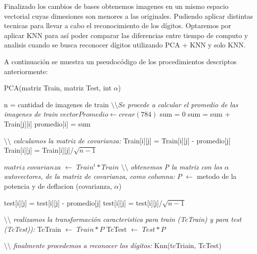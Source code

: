  Finalizado los cambios de bases obtenemos imagenes en un mismo espacio vectorial cuyas dimesiones son menores a las originales. Pudiendo aplicar distintas tecnicas para llevar a cabo el reconocimiento de los dígitos. Optaremos por aplicar KNN para así poder comparar las diferencias entre tiempo de computo y analisis cuando se busca reconocer dígitos utilizando PCA + KNN y solo KNN.
 
A continuación se muestra un pseudocódigo de los procedimientos descriptos anteriormente:

\begin{algorithm}[H]
\caption{PCA(matriz Train, matriz Test, int $\alpha$)}
\begin{algorithmic}[1]
\State n = cantidad de imagenes de train
\State \textit{$\setminus\setminus$Se procede a calcular el promedio de las imagenes de train}
\State $ vector Promedio \gets crear(784)$
	\State sum = 0	
		\State sum = sum + Train[j][i]
	\EndFor
	\State promedio[i] = sum
\EndFor

\State \textit{$\setminus\setminus$ calculamos la matriz de covarianza:}
		\State Train[i][j] = Train[i][j] - promedio[j]
	\EndFor
	\State Train[i][j] = Train[i][j]/$\sqrt{n-1}$
\EndFor	

\State $matriz$ $covarianza$ $\gets$ $Train^{t}*Train$	
\State \textit{$\setminus\setminus$ obtenemos P la matriz con los $\alpha$ autovectores, de la matriz de covarianza, como columna:}
\State $P$ $\gets$ metodo de la potencia y de deflacion (covarianza, $\alpha$)

		\State test[i][j] = test[i][j] - promedio[j]
	\EndFor
	\State test[i][j] = test[i][j]/$\sqrt{n-1}$
\EndFor	

\State \textit{$\setminus\setminus$ realizamos la transformaci\'on caracteristica para train (TcTrain) y para test (TcTest)):}
\State  TcTrain $\gets$ $Train*P$
\State  TcTest $\gets$ $Test*P$


\State \textit{$\setminus\setminus$ finalmente procedemos a reconocer los d\'igitos:}
\State Knn(tcTriain, TcTest)
\end{algorithmic}
\end{algorithm}
